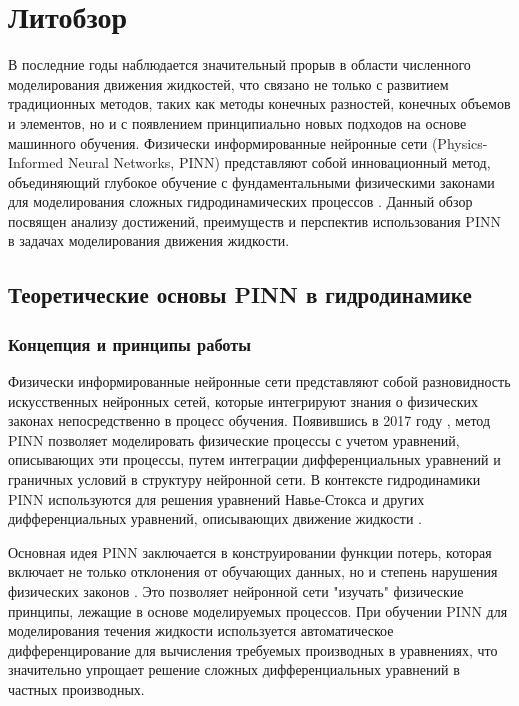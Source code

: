\chapter{Литобзор}

В последние годы наблюдается значительный прорыв в области численного моделирования движения жидкостей,
что связано не только с развитием традиционных методов, таких как методы конечных разностей, конечных
объемов и элементов, но и с появлением принципиально новых подходов на основе машинного обучения.
Физически информированные нейронные сети (Physics-Informed Neural Networks, PINN) представляют собой
инновационный метод, объединяющий глубокое обучение с фундаментальными физическими законами для
моделирования сложных гидродинамических процессов \cite{raissi2019physics}. Данный обзор посвящен
анализу достижений, преимуществ и перспектив использования PINN в задачах моделирования движения
жидкости.

\section{Теоретические основы PINN в гидродинамике}
\subsection{Концепция и принципы работы}
Физически информированные нейронные сети представляют собой разновидность искусственных нейронных сетей,
которые интегрируют знания о физических законах непосредственно в процесс обучения. Появившись в 2017
году \cite{raissi2017physics}, метод PINN позволяет моделировать физические процессы с учетом уравнений,
описывающих эти процессы, путем интеграции дифференциальных уравнений и граничных условий в структуру
нейронной сети. В контексте гидродинамики PINN используются для решения уравнений Навье-Стокса и других
дифференциальных уравнений, описывающих движение жидкости \cite{cai2021physics}.

Основная идея PINN заключается в конструировании функции потерь, которая включает не только отклонения
от обучающих данных, но и степень нарушения физических законов \cite{karniadakis2021physics}. Это
позволяет нейронной сети "изучать" физические принципы, лежащие в основе моделируемых процессов. При
обучении PINN для моделирования течения жидкости используется автоматическое дифференцирование для
вычисления требуемых производных в уравнениях, что значительно упрощает решение сложных дифференциальных
уравнений в частных производных.

